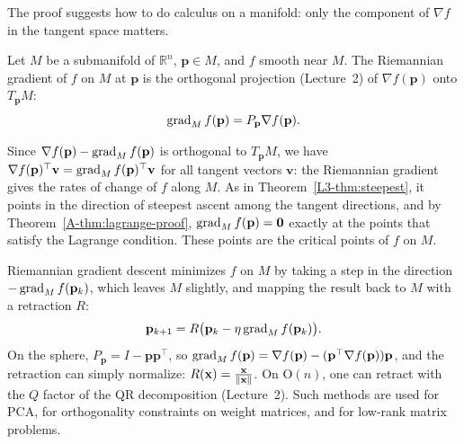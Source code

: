 The proof suggests how to do calculus on a manifold: only the component of $\nabla f$ in the tangent space matters.

\begin{definition}\label{A-def:riemannian-gradient}
    Let $M$ be a submanifold of $\mathbb{R}^n$, $\mathbf{p} \in M$, and $f$ smooth near $M$. The Riemannian gradient of $f$ on $M$ at $\mathbf{p}$ is the orthogonal projection (Lecture~2) of $\nabla f(\mathbf{p})$ onto $T_{\mathbf{p}}M$:
    \[\operatorname{grad}_M f(\mathbf{p}) = P_{\mathbf{p}}\nabla f(\mathbf{p}).\]
\end{definition}

Since $\nabla f(\mathbf{p}) - \operatorname{grad}_M f(\mathbf{p})$ is orthogonal to $T_{\mathbf{p}}M$, we have $\nabla f(\mathbf{p})^\top\mathbf{v} = \operatorname{grad}_M f(\mathbf{p})^\top\mathbf{v}$ for all tangent vectors $\mathbf{v}$: the Riemannian gradient gives the rates of change of $f$ along $M$. As in Theorem~\ref{L3-thm:steepest}, it points in the direction of steepest ascent among the tangent directions, and by Theorem~\ref{A-thm:lagrange-proof}, $\operatorname{grad}_M f(\mathbf{p}) = \mathbf{0}$ exactly at the points that satisfy the Lagrange condition. These points are the critical points of $f$ on $M$.

Riemannian gradient descent minimizes $f$ on $M$ by taking a step in the direction $-\operatorname{grad}_M f(\mathbf{p}_k)$, which leaves $M$ slightly, and mapping the result back to $M$ with a retraction $R$:
\[\mathbf{p}_{k+1} = R\big(\mathbf{p}_k - \eta\operatorname{grad}_M f(\mathbf{p}_k)\big).\]
On the sphere, $P_{\mathbf{p}} = I - \mathbf{p}\mathbf{p}^\top$, so $\operatorname{grad}_M f(\mathbf{p}) = \nabla f(\mathbf{p}) - (\mathbf{p}^\top\nabla f(\mathbf{p}))\mathbf{p}$, and the retraction can simply normalize: $R(\mathbf{x}) = \frac{\mathbf{x}}{\lVert \mathbf{x} \rVert}$. On $\mathrm{O}(n)$, one can retract with the $Q$ factor of the QR decomposition (Lecture~2). Such methods are used for PCA, for orthogonality constraints on weight matrices, and for low-rank matrix problems.

